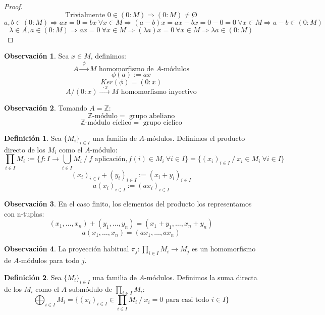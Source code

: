 \documentclass{article}
\theoremstyle{theorem-style}  %
\theoremstyle{definition}
\newtheorem{definition}{Definición}[section]
\newtheorem*{observation}{Observación} %
\theoremstyle{example-style}
\begin{document}
\begin{proof}
	\[ \text{Trivialmente } 0 \in (0:M) \Rightarrow (0:M) \neq \text{\O}\]
	\[ a,b \in (0:M) \Rightarrow ax=0=bx \ \forall x \in M \Rightarrow (a-b)x=ax-bx=0-0=0 \ \forall x \in M \Rightarrow a-b \in (0:M) \]
	\[ \lambda \in A, a \in (0:M) \Rightarrow ax=0 \ \forall x \in M \Rightarrow (\lambda a)x=0 \ \forall x \in M \Rightarrow \lambda a \in (0:M) \]
\end{proof}

\begin{observation}
	Sea $x \in M$, definimos:
	\[ A\xrightarrow{\ \ \phi \ \ } M \text{ homomorfismo de $A$-módulos}\]
	\[ \phi(a):=ax\]
	\[ Ker(\phi)=(0:x)\]
	\[A/(0:x)\xrightarrow{\ \ \cdot x\ \ }M \text{ homomorfismo inyectivo}\]
\end{observation}

\begin{observation}
	Tomando $A=\mathbb{Z}$:
	\[ \mathbb{Z}\text{-módulo}=\text{ grupo abeliano}\]
	\[ \mathbb{Z}\text{-módulo cíclico}=\text{ grupo cíclico}\]
\end{observation}

\begin{definition}
	Sea $\{M_i\}_{i\in I}$ una familia de $A$-módulos. Definimos el producto directo de los $M_i$ como el $A$-módulo:
	\[ \prod_{i\in I}M_i := \{f:I\rightarrow\bigcup_{i\in I}M_i \ / \ \text{$f$ aplicación}, f(i)\in M_i \ \forall i \in I\} = \{(x_i)_{i\in I} \ / \ x_i \in M_i \ \forall i \in I\}\]
	\[(x_i)_{i\in I} + (y_i)_{i\in I} := (x_i + y_i)_{i\in I}\]
	\[a(x_i)_{i\in I} := (ax_i)_{i\in I}\]
\end{definition}

\begin{observation}
	En el caso finito, los elementos del producto los representamos con n-tuplas:
	\[(x_1,\dots,x_n)+(y_1,\dots,y_n)=(x_1+y_1,\dots,x_n+y_n)\]
	\[a(x_1,\dots,x_n)=(ax_1,\dots,ax_n)\]
\end{observation}

\begin{observation}
	La proyección habitual $\pi_j:\prod_{i\in I}M_i \longrightarrow M_j$ es un homomorfismo de $A$-módulos para todo $j$.
\end{observation}

\begin{definition}
	Sea $\{M_i\}_{i\in I}$ una familia de $A$-módulos. Definimos la suma directa de los $M_i$ como el $A$-submódulo de $\prod_{i\in I}M_i$:
	\[\bigoplus_{i\in I}M_i=\{(x_i)_{i\in I} \in \prod_{i\in I}M_i \ / \ x_i=0 \text{ para casi todo } i \in I\}\]
\end{definition}
\end{document}
